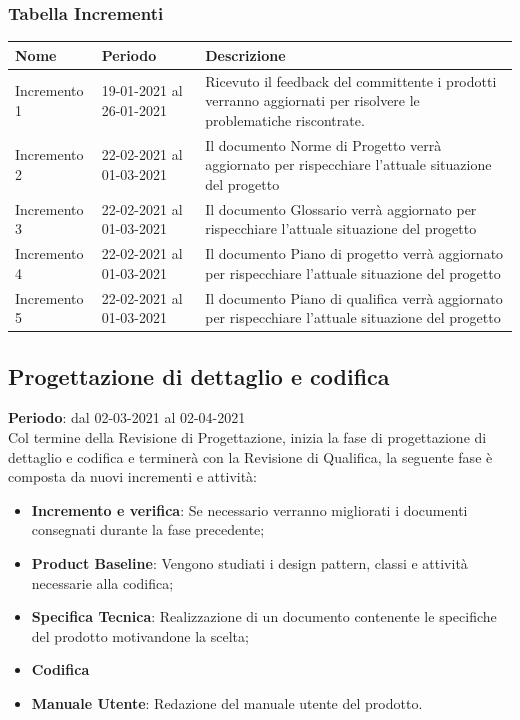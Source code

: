 	\subsubsection{Tabella Incrementi}
		\begin{center}
    			\begin{tabular}{ | l | p{5cm} | p{8cm} |}
   			 \hline
    			Nome & Periodo & Descrizione \\ \hline
    			Incremento 1 & 19-01-2021 al 26-01-2021 & Ricevuto il feedback del committente i prodotti verranno aggiornati per risolvere le problematiche riscontrate. \\ \hline
    			Incremento 2 & 22-02-2021 al 01-03-2021 & Il documento Norme di Progetto verrà aggiornato per rispecchiare l'attuale situazione del progetto \\ \hline
    			Incremento 3 & 22-02-2021 al 01-03-2021 & Il documento Glossario verrà aggiornato per rispecchiare l'attuale situazione del progetto \\ \hline
			Incremento 4 & 22-02-2021 al 01-03-2021 & Il documento Piano di progetto verrà aggiornato per rispecchiare l'attuale situazione del progetto \\ \hline
			Incremento 5 & 22-02-2021 al 01-03-2021 & Il documento Piano di qualifica verrà aggiornato per rispecchiare l'attuale situazione del progetto \\ \hline
    			\end{tabular}
		\end{center}
	
	\subsection{Progettazione di dettaglio e codifica}
	\textbf{Periodo}: dal 02-03-2021 al 02-04-2021 \\
	Col termine della Revisione di Progettazione, inizia la fase di progettazione di dettaglio e codifica e terminerà con la Revisione di Qualifica, la seguente fase è composta da nuovi incrementi e attività:
	\begin{itemize}
		\item \textbf{Incremento e verifica}: Se necessario verranno migliorati i documenti consegnati durante la fase precedente;
		\item \textbf{Product Baseline}: Vengono studiati i design pattern, classi e attività necessarie alla codifica;
		\item \textbf{Specifica Tecnica}: Realizzazione di un documento contenente le specifiche del prodotto motivandone la scelta;
		\item \textbf{Codifica}
		\item \textbf{Manuale Utente}: Redazione del manuale utente del prodotto.
	\end{itemize}
	
